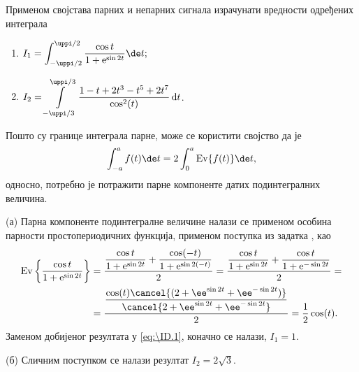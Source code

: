 \PID 
Применом својстава парних и непарних 
сигнала
израчунати вредности 
одређених интеграла 
\begin{multicols}{2}
\begin{enumerate}[label=(\alph*)]
\item
$\displaystyle 
I_1 = 
\int_{-\uppi/2}^{\uppi/2}
\dfrac{\cos t}{1 + {\rm e}^{\sin 2t}}
 \de t;
$

\item
$\displaystyle
I_2 = \int\limits_{-\uppi/3}^{\uppi/3}
\dfrac{1 - t + 2t^3 - t^5 + 2t^7}{\cos^2 (t)}\,{\rm d} t$.
\end{enumerate}
\end{multicols}

\RESENJE 
Пошто су границе интеграла парне, може се користити својство да је 
\begin{equation}
\displaystyle \int_{-a}^{a} f(t) \de t = 2\int_{0}^{a} {\rm Ev}\{f(t)\} \de t, \label{eq:\ID.1}
\end{equation}
односно, потребно је потражити парне компоненте датих подинтегралних величина. 

(а) Парна компоненте подинтегралне величине налази се применом особина парности простопериодичних функција, 
применом поступка из задатка , као 
\begin{eqnarray}
    {\rm Ev}\left\{  
        \dfrac{\cos t}{1 + {\rm e}^{\sin 2t}}
    \right\}
    &= \dfrac{
        \dfrac{\cos t}{1 + {\rm e}^{\sin 2t}} + \dfrac{\cos (-t)}{1 + {\rm e}^{\sin 2(-t)}}
    }{2}
    =
    \dfrac{
        \dfrac{\cos t}{1 + {\rm e}^{\sin 2t}} + \dfrac{\cos t}{1 + {\rm e}^{-\sin 2t}}
    }{2}
    =  \\
    &= \dfrac{ \dfrac{\cos(t) \cancel{( 2 + \ee^{\sin 2t} + \ee^{-\sin 2t} )} } { \cancel{2 + \ee^{\sin 2t} + \ee^{-\sin 2t}} } }{2}
    = \dfrac{1}{2} \cos(t).
\end{eqnarray}
Заменом добијеног резултата у \eqref{eq:\ID.1}, коначно се налази, $I_1 = 1$.

(б) Сличним поступком се налази резултат $I_2 = 2\sqrt 3$.
